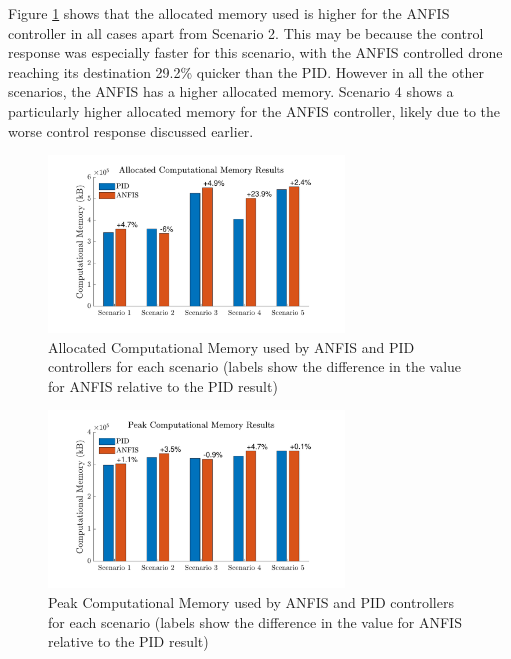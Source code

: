 Figure \ref{fig:alloc_memory} shows that the allocated memory used is higher for the ANFIS controller in all cases apart from Scenario 2. This may be because the control response was especially faster for this scenario, with the ANFIS controlled drone reaching its destination 29.2\% quicker than the PID. However in all the other scenarios, the ANFIS has a higher allocated memory. Scenario 4 shows a particularly higher allocated memory for the ANFIS controller, likely due to the worse control response discussed earlier. 
\begin{figure}[H]
    \centering
    \includegraphics[width = 0.7\textwidth]{img/Allocated Computational Power.pdf}
    \caption{Allocated Computational Memory used by ANFIS and PID controllers for each scenario (labels show the difference in the value for ANFIS relative to the PID result)}
    \label{fig:alloc_memory}
\end{figure}
\begin{figure}[H]
    \centering
    \includegraphics[width = 0.7\textwidth]{img/Peak Computational Power.pdf}
    \caption{Peak Computational Memory used by ANFIS and PID controllers for each scenario (labels show the difference in the value for ANFIS relative to the PID result)}
    \label{fig:peak_memory}
\end{figure}

